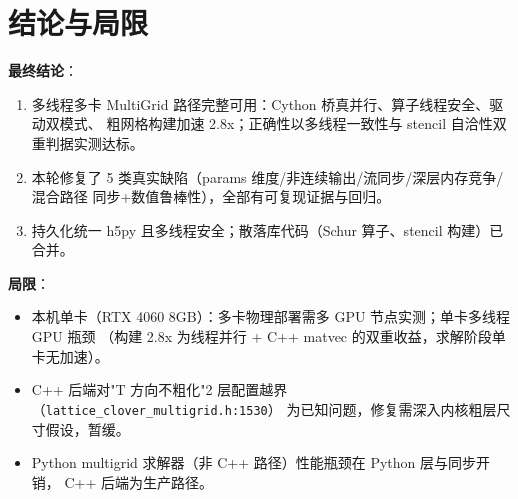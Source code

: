 \documentclass[UTF8]{ctexart}
\begin{document}
\section{结论与局限}

\begin{conclbox}
\textbf{最终结论}：
\begin{enumerate}
  \item 多线程多卡 MultiGrid 路径完整可用：Cython 桥真并行、算子线程安全、驱动双模式、
        粗网格构建加速 2.8x；正确性以多线程一致性与 stencil 自洽性双重判据实测达标。
  \item 本轮修复了 5 类真实缺陷（params 维度/非连续输出/流同步/深层内存竞争/混合路径
        同步+数值鲁棒性），全部有可复现证据与回归。
  \item 持久化统一 h5py 且多线程安全；散落库代码（Schur 算子、stencil 构建）已合并。
\end{enumerate}
\end{conclbox}

\textbf{局限}：
\begin{itemize}
  \item 本机单卡（RTX 4060 8GB）：多卡物理部署需多 GPU 节点实测；单卡多线程 GPU 瓶颈
        （构建 2.8x 为线程并行 + C++ matvec 的双重收益，求解阶段单卡无加速）。
  \item C++ 后端对"T 方向不粗化"2 层配置越界（\texttt{lattice\_clover\_multigrid.h:1530}）
        为已知问题，修复需深入内核粗层尺寸假设，暂缓。
  \item Python multigrid 求解器（非 C++ 路径）性能瓶颈在 Python 层与同步开销，
        C++ 后端为生产路径。
\end{itemize}
\end{document}

